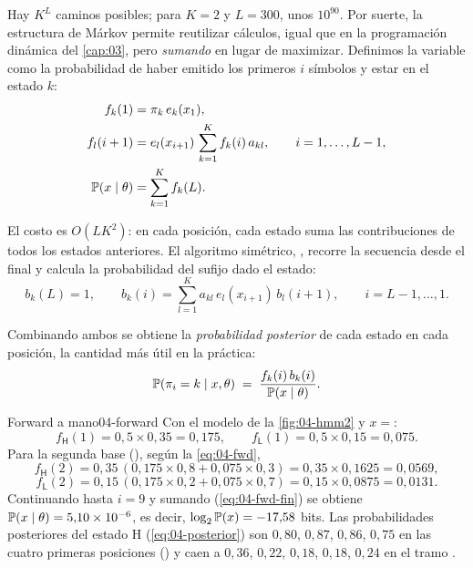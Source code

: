 Hay $K^L$ caminos posibles; para $K=2$ y $L=300$, unos $10^{90}$. Por suerte, la estructura de Márkov permite reutilizar cálculos, igual que en la programación dinámica del \cref{cap:03}, pero \emph{sumando} en lugar de maximizar. Definimos la variable  como la probabilidad de haber emitido los primeros $i$ símbolos y estar en el estado $k$:
\begin{align}
f_k(1) &= \pi_k\,e_k(x_1), \label{eq:04-fwd-ini}\\
f_l(i+1) &= e_l(x_{i+1})\,\sum_{k=1}^{K} f_k(i)\,a_{kl}, \qquad i=1,\dots,L-1, \label{eq:04-fwd}\\
\mathbb{P}(x\mid\theta) &= \sum_{k=1}^{K} f_k(L). \label{eq:04-fwd-fin}
\end{align}

\begin{simbolos}
\end{simbolos}

El costo es $O(LK^2)$: en cada posición, cada estado suma las contribuciones de todos los estados anteriores. El algoritmo simétrico, , recorre la secuencia desde el final y calcula la probabilidad del sufijo dado el estado:
\begin{equation}\label{eq:04-bwd}
b_k(L)=1,\qquad b_k(i) = \sum_{l=1}^{K} a_{kl}\,e_l(x_{i+1})\,b_l(i+1),\qquad i=L-1,\dots,1.
\end{equation}

\begin{simbolos}
\end{simbolos}

\noindent Combinando ambos se obtiene la \emph{probabilidad posterior} de cada estado en cada posición, la cantidad más útil en la práctica:
\begin{equation}\label{eq:04-posterior}
\mathbb{P}(\pi_i = k\mid x,\theta) \;=\; \frac{f_k(i)\,b_k(i)}{\mathbb{P}(x\mid\theta)}.
\end{equation}

\begin{ejemplo}{Forward a mano}{04-forward}
Con el modelo de la \cref{fig:04-hmm2} y $x={}$:
\[
f_{\textsf{H}}(1)=0{,}5\times0{,}35=0{,}175,\qquad f_{\textsf{L}}(1)=0{,}5\times0{,}15=0{,}075.
\]
Para la segunda base (), según la \cref{eq:04-fwd},
\[
f_{\textsf{H}}(2)=0{,}35\,(0{,}175\times0{,}8+0{,}075\times0{,}3)=0{,}35\times0{,}1625=0{,}0569,
\]
\[
f_{\textsf{L}}(2)=0{,}15\,(0{,}175\times0{,}2+0{,}075\times0{,}7)=0{,}15\times0{,}0875=0{,}0131.
\]
Continuando hasta $i=9$ y sumando (\cref{eq:04-fwd-fin}) se obtiene $\mathbb{P}(x\mid\theta)=5{,}10\times10^{-6}$, es decir, $\log_2\mathbb{P}(x)=-17{,}58$ bits. Las probabilidades posteriores del estado \textsf{H} (\cref{eq:04-posterior}) son $0{,}80$, $0{,}87$, $0{,}86$, $0{,}75$ en las cuatro primeras posiciones () y caen a $0{,}36$, $0{,}22$, $0{,}18$, $0{,}18$, $0{,}24$ en el tramo .
\end{ejemplo}

